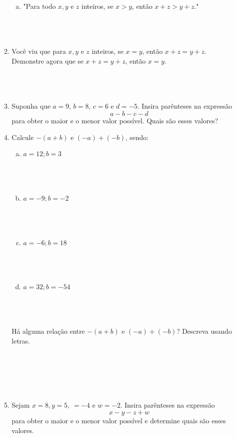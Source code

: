 \documentclass[a4paper,14pt]{article}
\begin{document}
\begin{multicols}{2}
\begin{enumerate}
\begin{enumerate}[a)]
    				\item "Para todo $x, y$ e $z$ inteiros, se $x > y$, então $x + z > y + z$." \\\\\\\\   				
    			\end{enumerate}
    			\item Você viu que para $x, y$ e $z$ inteiros, se $x = y$, então $x + z = y + z$. \\
    			Demonstre agora que se $x + z = y + z$, então $x = y$. \\\\\\\\
    			\item Suponha que $a = 9$, $b = 8$, $c = 6$ e $d = -5$. Insira parênteses na expressão
    			\begin{equation*}a - b - c - d\end{equation*}
    			para obter o maior e o menor valor possível. Quais são esses valores? \\
    			\item Calcule $-(a + b)$ e $(-a) +(-b)$, sendo:
    			\begin{enumerate}[a)]
    				\item $a = 12; b = 3$ \\\\\\\\
    				\item $a = -9; b = -2$ \\\\\\\\
    				\item $a = -6; b = 18$ \\\\\\\\
    				\item $a = 32; b = -54$ \\\\\\\\		
    			\end{enumerate}
    			Há alguma relação entre $-(a + b)$ e $(-a)+(-b)$? Descreva usando letras. \\\\\\\\\\\\
    			\item Sejam $x = 8, y = 5, \ = -4$ e $w = -2$. Insira parênteses na expressão
    			\begin{equation*}x - y - z + w\end{equation*}
    			para obter o maior e o menor valor possível e determine quais são esses valores.
    		\end{enumerate}
	\end{multicols}
\end{document}
